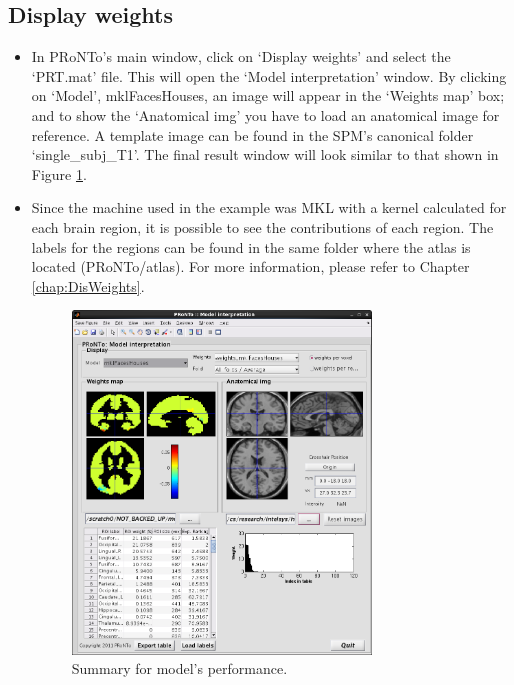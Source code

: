 
\subsection{Display weights}

\begin{itemize}
	
	\item In PRoNTo's main window, click on `Display weights' and select the `PRT.mat' file. This will open the `Model interpretation' window. By clicking on `Model', mklFacesHouses, an image will appear in the `Weights map' box; and to show the `Anatomical img' you have to load an anatomical image for reference. A template image can be found in the SPM's canonical folder `single\_subj\_T1'. The final result window will look similar to that shown in Figure \ref{fig:modelInterpretationMKL}.

    \item Since the machine used in the example was MKL with a kernel calculated for each brain region, it is possible to see the contributions of each region. The labels for the regions can be found in the same folder where the atlas is located (PRoNTo/atlas). For more information, please refer to Chapter \ref{chap:DisWeights}.

\begin{figure}[!h]
	\centering
		\includegraphics[width=0.75\textwidth]{images/Tutorial/mkl/modelInterpretationMKL.png}
	\caption{Summary for model's performance.}
	\label{fig:modelInterpretationMKL}
\end{figure}
	
\end{itemize}

